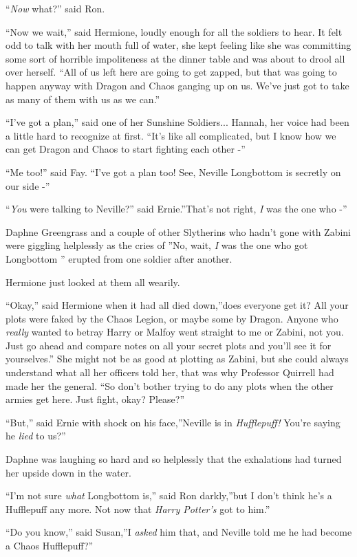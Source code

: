 ``\emph{Now} what?'' said Ron.

``Now we wait,'' said Hermione, loudly enough for all the soldiers to
hear. It felt odd to talk with her mouth full of water, she kept feeling
like she was committing some sort of horrible impoliteness at the dinner
table and was about to drool all over herself. ``All of us left here are
going to get zapped, but that was going to happen anyway with Dragon and
Chaos ganging up on us. We've just got to take as many of them with us
as we can.''

``I've got a plan,'' said one of her Sunshine Soldiers... Hannah,
her voice had been a little hard to recognize at first. ``It's like all
complicated, but I know how we can get Dragon and Chaos to start
fighting each other -''

``Me too!'' said Fay. ``I've got a plan too! See, Neville Longbottom is
secretly on our side -''

``\emph{You} were talking to Neville?'' said Ernie.''That's not right,
\emph{I} was the one who -''

Daphne Greengrass and a couple of other Slytherins who hadn't gone with
Zabini were giggling helplessly as the cries of ''No, wait, \emph{I} was
the one who got Longbottom '' erupted from one soldier after another.

Hermione just looked at them all wearily.

``Okay,'' said Hermione when it had all died down,''does everyone get
it? All your plots were faked by the Chaos Legion, or maybe some by
Dragon. Anyone who \emph{really} wanted to betray Harry or Malfoy went
straight to me or Zabini, not you. Just go ahead and compare notes on
all your secret plots and you'll see it for yourselves.'' She might not
be as good at plotting as Zabini, but she could always understand what
all her officers told her, that was why Professor Quirrell had made her
the general. ``So don't bother trying to do any plots when the other
armies get here. Just fight, okay? Please?''

``But,'' said Ernie with shock on his face,''Neville is in
\emph{Hufflepuff!} You're saying he \emph{lied} to us?''

Daphne was laughing so hard and so helplessly that the exhalations had
turned her upside down in the water.

``I'm not sure \emph{what} Longbottom is,'' said Ron darkly,''but I don't
think he's a Hufflepuff any more. Not now that \emph{Harry Potter's} got
to him.''

``Do you know,'' said Susan,''I \emph{asked} him that, and Neville told
me he had become a Chaos Hufflepuff?''

